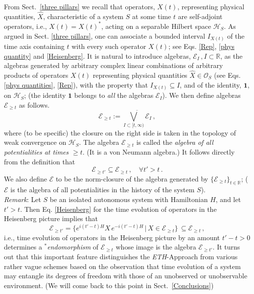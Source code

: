 \documentclass[12pt]{article}
\begin{document}
From Sect.~\ref{three pillars} we recall that operators, $X(t)$, representing physical quantities, $\hat{X}$, characteristic
of a system $S$ at some time $t$  are self-adjoint operators, i.e., $X(t)=X(t)^{*}$, acting on a separable
Hilbert space $\mathcal{H}_S$. As argued in Sect. \ref{three pillars}, one can associate a bounded interval
$I_{X(t)}$ of the time axis containing $t$ with every such operator  $X(t)$; see Eqs. \eqref{Rep}, \eqref{phys quantity}
and \eqref{Heisenberg}. It is natural to introduce algebras, $\mathcal{E}_I\,, I \subset \mathbb{R}$, as the algebras generated
by arbitrary complex linear combinations of arbitrary products of operators $X(t)$ representing physical
quantities $\hat{X} \in \mathcal{O}_S$ (see Eqs. \eqref{phys quantities}, \eqref{Rep}), with the property
that $I_{X(t)} \subseteq I$, and of the identity, $\mathbf{1}$, on $\mathcal{H}_S$; (the identity $\mathbf{1}$
belongs to \textit{all} the algebras $\mathcal{E}_I$). We then define algebras $\mathcal{E}_{\geq t}$ as follows.
\begin{equation}\label{events}
\mathcal{E}_{\geq t} := \overline{\bigvee_{I \subset [t, \infty)} \mathcal{E}_I}\,,
\end{equation}
where (to be specific) the closure on the right side is taken in the topology of weak convergence on $\mathcal{H}_S$.
The algebra $\mathcal{E}_{\geq t}$ is called the \textit{algebra of all potentialities at times $\geq t$}. (It is a von Neumann algebra.) It follows directly from the definition that
\begin{equation}\label{inclusion}
\mathcal{E}_{\geq t'} \subseteq \mathcal{E}_{\geq t}\,, \quad \forall t' > t\,.
\end{equation}
We also define $\mathcal{E}$ to be the norm-closure of the algebra generated by
$\big\{ \mathcal{E}_{\geq t} \big\}_{t\in \mathbb{R}}$; ($\mathcal{E}$ is the algebra of all potentialities in the history of the system $S$).\\

\textit{Remark}: Let $S$ be an isolated autonomous system with Hamiltonian $H$, and let $t'>t$. Then Eq. \eqref{Heisenberg}
for the time evolution of operators in the Heisenberg picture implies that
\begin{equation}\label{automorphism}
\mathcal{E}_{\geq t'}= \big\{e^{i(t'-t)H} X\, e^{-i(t'-t)H} \,\vert\, X\in \mathcal{E}_{\geq t}\big\}\,\subseteq \mathcal{E}_{\geq t}\,,
\end{equation}
i.e., time evolution of operators in the Heisenberg picture by an amount $t'-t>0$ determines a \textit{$^{*}$endomorphism}
of $\mathcal{E}_{\geq t}$ whose image is the algebra $\mathcal{E}_{\geq t'}$. It turns out that this important feature
distinguishes the \textit{ETH}-Approach  from various rather vague schemes based on the observation that time evolution
of a system may entangle its degrees of freedom with those of an unobserved or unobservable environment. (We will
come back to this point in Sect.~\ref{Conclusions})\\
\end{document}
